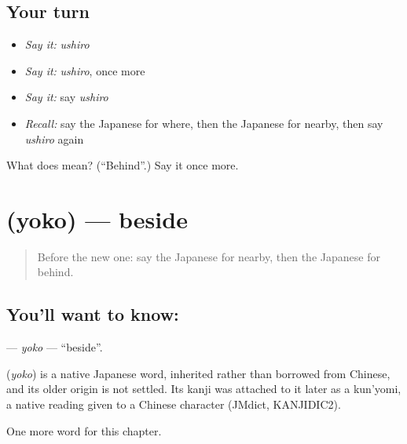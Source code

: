 \subsection*{Your turn}
\begin{itemize}
\raggedright
  \item \emph{Say it:} \emph{ushiro}
  \item \emph{Say it:} \emph{ushiro}, once more
  \item \emph{Say it:} say \emph{ushiro}
  \item \emph{Recall:} say the Japanese for where, then the Japanese for nearby, then say \emph{ushiro} again
\end{itemize}

\begin{tcolorbox}[breakable,colback=teal!4,colframe=teal!35!black,title={Before you move on}]
What does  mean? (\textquotedblleft{}Behind\textquotedblright{}.) Say it once more.
\end{tcolorbox}
\section[\texorpdfstring{\ja{よこ} (yoko)}{よこ (yoko)}]{ (yoko) — beside}

\label{lesson:JA-C78-yoko}



\begin{quote}
Before the new one: say the Japanese for nearby, then the Japanese for behind.
\end{quote}

\subsection*{You'll want to know: }
\textbf{} — \emph{yoko} — \textquotedblleft{}beside\textquotedblright{}.

\begin{cousinweb}
\textbf{} (\emph{yoko}) is a native Japanese word, inherited rather than borrowed from Chinese, and its older origin is not settled. Its kanji was attached to it later as a kun'yomi, a native reading given to a Chinese character (JMdict, KANJIDIC2).
\end{cousinweb}

\begin{grammarlens}[title={What you've built}]
One more word for this chapter.
\end{grammarlens}

